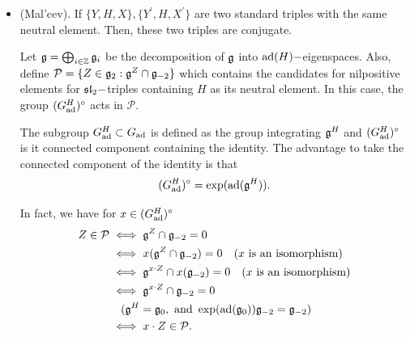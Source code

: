 \begin{itemize}
\item (Mal'cev). If $\{Y,H,X\},\{Y^\prime,H,X^\prime\}$ are two standard triples with the same neutral element. Then, these 
two triples are conjugate.\par 
Let $\mathfrak{g}=\bigoplus_{i\in\mathbb{Z}}\mathfrak{g}_i$ be the decomposition of $\mathfrak{g}$ into $\text{ad}(H)-$eigenspaces.
Also, define $\mathcal{P}=\{Z\in\mathfrak{g}_2:\mathfrak{g}^Z\cap\mathfrak{g}_{-2}\}$ which contains the candidates for nilpositive elements 
for $\mathfrak{sl}_2-$triples containing $H$ as its neutral element. In this case, the group $(G_{\text{ad}}^H)^\circ$ acts in 
$\mathcal{P}$. 
\begin{dang}
    \begin{remark}
        The subgroup $G_{\text{ad}}^H\subset G_{\text{ad}}$ is defined as the group integrating $\mathfrak{g}^H$ and 
        $(G_{\text{ad}}^H)^\circ$ is it connected component containing the identity. The advantage to take 
        the connected component of the identity is that 
        \begin{equation}
            (G_{\text{ad}}^H)^\circ=\exp(\text{ad}(\mathfrak{g}^H)).
        \end{equation}
    \end{remark}
\end{dang}
In fact, we have for $x\in (G_{\text{ad}}^H)^\circ$
\begin{equation}
    \begin{split}
        Z\in\mathcal{P}&\iff \mathfrak{g}^Z\cap\mathfrak{g}_{-2}=0\\
        &\iff x(\mathfrak{g}^Z\cap\mathfrak{g}_{-2})=0 \quad(x \text{ is an isomorphism})\\
        &\iff \mathfrak{g}^{x\cdot Z}\cap x(\mathfrak{g}_{-2})=0\quad(x \text{ is an isomorphism})\\
        &\iff \mathfrak{g}^{x\cdot Z}\cap \mathfrak{g}_{-2}=0\\
        &\quad(\mathfrak{g}^H=\mathfrak{g}_0, \text{ and }\exp(\text{ad}(\mathfrak{g}_0))\mathfrak{g}_{-2}=\mathfrak{g}_{-2})\\
        &\iff x\cdot Z\in\mathcal{P}.
    \end{split}
\end{equation}


\end{itemize}
